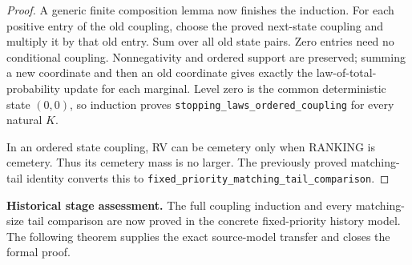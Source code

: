 \documentclass[11pt]{article}
\begin{document}
\begin{proof}
A generic finite composition lemma now finishes the induction. For each
positive entry of the old coupling, choose the proved next-state coupling
and multiply it by that old entry. Sum over all old state pairs. Zero
entries need no conditional coupling. Nonnegativity and ordered support
are preserved; summing a new coordinate and then an old coordinate gives
exactly the law-of-total-probability update for each marginal.
Level zero is the common deterministic state $(0,0)$, so induction proves
\texttt{stopping\_laws\_ordered\_coupling} for every natural $K$.

In an ordered state coupling, RV can be cemetery only when RANKING is
cemetery. Thus its cemetery mass is no larger. The previously proved
matching-tail identity converts this to
\texttt{fixed\_priority\_matching\_tail\_comparison}.
\end{proof}

\noindent\textbf{Historical stage assessment.}
The full coupling induction and every matching-size tail comparison are
now proved in the concrete fixed-priority history model. The following
theorem supplies the exact source-model transfer and closes the formal proof.
\end{document}
